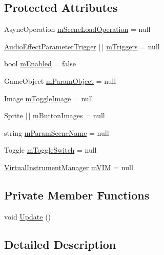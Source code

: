 \subsection*{Protected Attributes}
\begin{DoxyCompactItemize}
\item 
Async\+Operation \hyperlink{class_a_t_i_1_1_audio_effect_handler_a64e2617a1b7c1e6f4631a6aee98fbf3e}{m\+Scene\+Load\+Operation} = null
\item 
\hyperlink{class_a_t_i_1_1_audio_effect_parameter_trigger}{Audio\+Effect\+Parameter\+Trigger} \mbox{[}$\,$\mbox{]} \hyperlink{class_a_t_i_1_1_audio_effect_handler_a1db04dc85daf07d045117d9bc585e944}{m\+Triggers} = null
\item 
bool \hyperlink{class_a_t_i_1_1_audio_effect_handler_a378c463b827ad6e41d09a4ec2caff351}{m\+Enabled} = false
\item 
Game\+Object \hyperlink{class_a_t_i_1_1_audio_effect_handler_a02ca13686cb3fc7bf152051ec881b0ed}{m\+Param\+Object} = null
\item 
Image \hyperlink{class_a_t_i_1_1_audio_effect_handler_aa5bf03976a14594f089aac5681c15a83}{m\+Toggle\+Image} = null
\item 
Sprite \mbox{[}$\,$\mbox{]} \hyperlink{class_a_t_i_1_1_audio_effect_handler_a6e1cfd5449b82870eacd7404a158c7a7}{m\+Button\+Images} = null
\item 
string \hyperlink{class_a_t_i_1_1_audio_effect_handler_a674c38f29ef923e6c9487c2dc991a8b6}{m\+Param\+Scene\+Name} = null
\item 
Toggle \hyperlink{class_a_t_i_1_1_audio_effect_handler_ae5f6b965d3401ff17fde2e77f33f9109}{m\+Toggle\+Switch} = null
\item 
\hyperlink{class_virtual_instrument_manager}{Virtual\+Instrument\+Manager} \hyperlink{class_a_t_i_1_1_audio_effect_handler_a6b5b6149cc376ff0f750ade08ba23bce}{m\+V\+IM} = null
\end{DoxyCompactItemize}
\subsection*{Private Member Functions}
\begin{DoxyCompactItemize}
\item 
void \hyperlink{class_a_t_i_1_1_audio_effect_handler_af41e912b86543e7c074531d2cd3f88dc}{Update} ()
\end{DoxyCompactItemize}


\subsection{Detailed Description}


